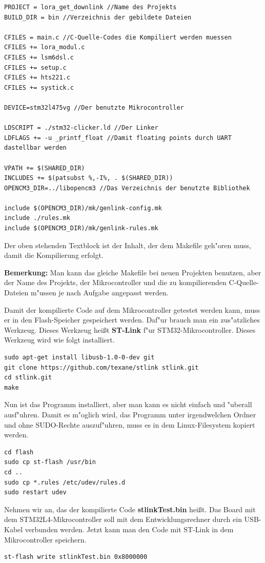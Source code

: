 \vspace{1cm}
\begin{lstlisting}[frame=single]
PROJECT = lora_get_downlink //Name des Projekts
BUILD_DIR = bin //Verzeichnis der gebildete Dateien

CFILES = main.c //C-Quelle-Codes die Kompiliert werden muessen
CFILES += lora_modul.c
CFILES += lsm6dsl.c
CFILES += setup.c
CFILES += hts221.c
CFILES += systick.c

DEVICE=stm32l475vg //Der benutzte Mikrocontroller

LDSCRIPT = ./stm32-clicker.ld //Der Linker
LDFLAGS += -u _printf_float //Damit floating points durch UART dastellbar werden

VPATH += $(SHARED_DIR)
INCLUDES += $(patsubst %,-I%, . $(SHARED_DIR))
OPENCM3_DIR=../libopencm3 //Das Verzeichnis der benutzte Bibliothek

include $(OPENCM3_DIR)/mk/genlink-config.mk
include ./rules.mk
include $(OPENCM3_DIR)/mk/genlink-rules.mk

\end{lstlisting}
Der oben stehenden Textblock ist der Inhalt, der dem Makefile geh"oren 
muss, damit die Kompilierung erfolgt.
 
\textbf{Bemerkung:} Man kann das gleiche Makefile bei neuen Projekten 
benutzen, aber der Name des Projekts, der Mikrocontroller und die zu 
kompilierenden C-Quelle-Dateien  m"ussen je nach Aufgabe angepasst 
werden.   

Damit der kompilierte Code auf dem Mikrocontroller getestet werden kann, muss er in den Flash-Speicher gespeichert werden. Daf"ur brauch man ein zus"atzliches Werkzeug. Dieses Werkzeug hei\ss{}t \textbf{ST-Link} f"ur STM32-Mikrocontroller. Dieses Werkzeug wird wie folgt installiert.

\begin{lstlisting}[frame=single]
sudo apt-get install libusb-1.0-0-dev git
git clone https://github.com/texane/stlink stlink.git
cd stlink.git
make
\end{lstlisting}
Nun ist das Programm installiert, aber man kann es nicht einfach und "uberall ausf"uhren. Damit es m"oglich wird, das Programm unter irgendwelchen Ordner und ohne SUDO-Rechte auszuf"uhren, muss es in dem Linux-Filesystem kopiert werden.
\begin{lstlisting}[frame=single]
cd flash
sudo cp st-flash /usr/bin
cd ..
sudo cp *.rules /etc/udev/rules.d
sudo restart udev
\end{lstlisting}

Nehmen wir an, das der kompilierte Code \textbf{stlinkTest.bin} hei\ss{}t. Das Board mit dem STM32L4-Mikrocontroller soll mit dem Entwicklungsrechner durch ein USB-Kabel  verbunden werden. Jetzt kann man den Code mit ST-Link in dem Mikrocontroller speichern. 
\begin{lstlisting}[frame=single]
st-flash write stlinkTest.bin 0x8000000
\end{lstlisting}

